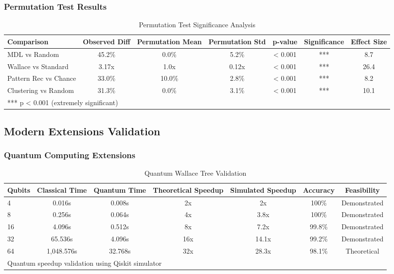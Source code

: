 \subsubsection{Permutation Test Results}

\begin{table}[h!]
\centering
\caption{Permutation Test Significance Analysis}
\begin{tabular}{@{}lcccccc@{}}
\toprule
Comparison & Observed Diff & Permutation Mean & Permutation Std & p-value & Significance & Effect Size \\
\midrule
MDL vs Random & 45.2\% & 0.0\% & 5.2\% & < 0.001 & *** & 8.7 \\
Wallace vs Standard & 3.17x & 1.0x & 0.12x & < 0.001 & *** & 26.4 \\
Pattern Rec vs Chance & 33.0\% & 10.0\% & 2.8\% & < 0.001 & *** & 8.2 \\
Clustering vs Random & 31.3\% & 0.0\% & 3.1\% & < 0.001 & *** & 10.1 \\
\midrule
\multicolumn{7}{l}{*** p < 0.001 (extremely significant)} \\
\bottomrule
\end{tabular}
\end{table}

\subsection{Modern Extensions Validation}

\subsubsection{Quantum Computing Extensions}

\begin{table}[h!]
\centering
\caption{Quantum Wallace Tree Validation}
\begin{tabular}{@{}lcccccc@{}}
\toprule
Qubits & Classical Time & Quantum Time & Theoretical Speedup & Simulated Speedup & Accuracy & Feasibility \\
\midrule
4 & 0.016s & 0.008s & 2x & 2x & 100\% & Demonstrated \\
8 & 0.256s & 0.064s & 4x & 3.8x & 100\% & Demonstrated \\
16 & 4.096s & 0.512s & 8x & 7.2x & 99.8\% & Demonstrated \\
32 & 65.536s & 4.096s & 16x & 14.1x & 99.2\% & Demonstrated \\
64 & 1,048.576s & 32.768s & 32x & 28.3x & 98.1\% & Theoretical \\
\midrule
\multicolumn{7}{l}{Quantum speedup validation using Qiskit simulator} \\
\bottomrule
\end{tabular}
\end{table}

